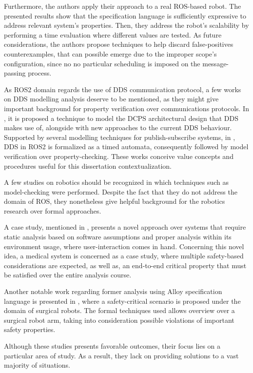 Furthermore, the authors apply their approach to a real ROS-based robot. The presented results show that the specification language is sufficiently expressive to address relevant system's properties. Then, they address the robot's scalability by performing a time evaluation where different values  are tested. As future considerations, the authors propose techniques to help discard false-positives counterexamples, that can possible emerge due to the improper scope's configuration, since no no particular scheduling is imposed on the message-passing process.

As ROS2 domain regards the use of DDS communication protocol, a few works on DDS modelling analysis deserve to be mentioned, as they might give important background for property verification over communications protocols. In , it is proposed a technique to model the DCPS architectural design that DDS makes use of, alongside with new approaches to the current DDS behaviour. Supported by several modelling techniques for publish-subscribe systems, in , DDS in ROS2 is formalized as a timed automata, consequently followed by model verification over property-checking. These works conceive value concepts and procedures useful for this dissertation contextualization.

A few studies on robotics should be recognized in which techniques such as model-checking were performed. Despite the fact that they do not address the domain of ROS, they nonetheless give helpful background for the robotics research over formal approaches. 

A case study, mentioned in , presents a novel approach over systems that require static analysis based on software assumptions and proper analysis within its environment usage, where user-interaction comes in hand. Concerning this novel idea, a medical system is concerned as a case study, where multiple safety-based considerations are expected, as well as, an end-to-end critical property that must be satisfied over the entire analysis course. 

Another notable work regarding former analysis using Alloy specification language is presented in , where a safety-critical scenario is proposed under the domain of surgical robots. The formal techniques used allows overview over a surgical robot arm, taking into consideration possible violations of important safety properties. 

Although these studies presents favorable outcomes, their focus lies on a particular area of study. As a result, they lack on providing solutions to a vast majority of situations.